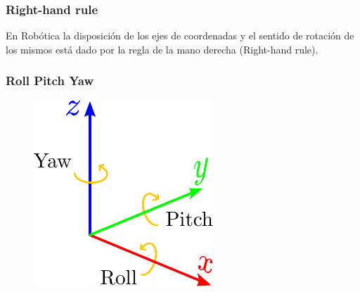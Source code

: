 \begin{frame}
    \frametitle{Right-hand rule}
    En Robótica la disposición de los ejes de coordenadas y el sentido de rotación de los mismos está dado por la regla de la mano derecha (Right-hand rule).

    \begin{figure}[!h]
        \centering
        \hspace{1cm}
    \end{figure}
\end{frame}

\begin{frame}
    \frametitle{Roll Pitch Yaw }
    
    \begin{figure}[!h]
        \includegraphics[width=0.4\columnwidth]{./images/roll_pitch_yaw.pdf}
    \end{figure}
\end{frame}

